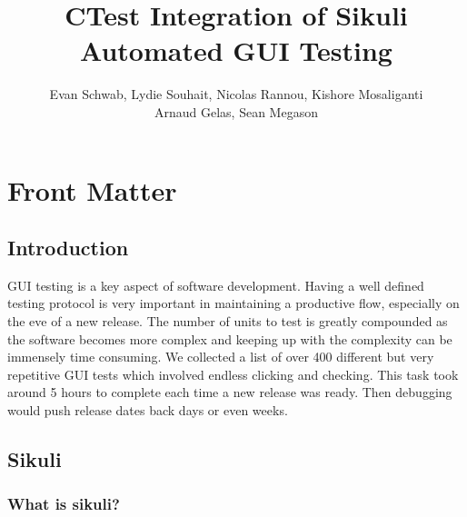 \documentclass{InsightArticle}
\title{CTest Integration of Sikuli Automated GUI Testing}
\author{Evan Schwab, Lydie Souhait, Nicolas Rannou, Kishore Mosaliganti\\
Arnaud Gelas, Sean Megason}
\newcommand{\IJhandlerIDnumber}{3196}
\begin{document}
\IJhandlefooter{\IJhandlerIDnumber}


\ifpdf
\else
\fi

\maketitle

\ifhtml
\chapter*{Front Matter\label{front}}
\fi

\begin{abstract}
\noindent
 
\end{abstract}

\IJhandlenote{\IJhandlerIDnumber}

\tableofcontents
\section{Introduction}
GUI testing is a key aspect of software development. Having a well defined testing protocol is very
important in maintaining a productive flow, especially on the eve of a new release.  The number of units
to test is greatly compounded as the software becomes more complex and keeping up with the complexity can be
immensely time consuming.  We collected a list of over 400 different but very repetitive GUI tests which
involved endless clicking and checking.  This task took around 5 hours to complete each time a new release was ready.
Then debugging would push release dates back days or even weeks.   
\section{Sikuli}

\subsection{What is sikuli?}
\end{document}
